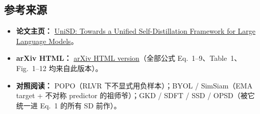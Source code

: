 \subsection{参考来源}

\begin{itemize}[leftmargin=1.5em]
  \item \textbf{论文主页：} \href{https://arxiv.org/abs/2605.06597}{UniSD: Towards a Unified Self-Distillation Framework for Large Language Models}。
  \item \textbf{arXiv HTML：} \href{https://arxiv.org/html/2605.06597v1}{arXiv HTML version}（全部公式 Eq.~1--9、Table~1、Fig.~1--12 均来自此版本）。
  \item \textbf{对照阅读：} POPO（RLVR 下不显式用负样本）；BYOL / SimSiam（EMA target + 不对称 predictor 的祖师爷）；GKD / SDFT / SSD / OPSD（被它统一进 Eq.~1 的所有 SD 前作）。
\end{itemize}
